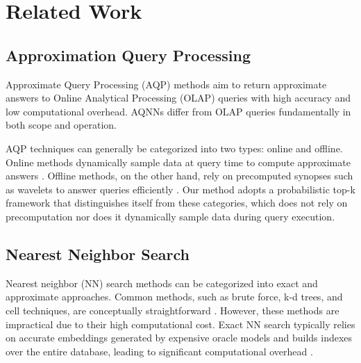 \section{Related Work}
\label{sec:relwork}
\subsection{Approximation Query Processing}

Approximate Query Processing (AQP) methods aim to return approximate answers to Online Analytical Processing (OLAP) queries with high accuracy and low computational overhead. AQNNs differ from OLAP queries fundamentally in both scope and operation. 

AQP techniques can generally be categorized into two types: online and offline. Online methods dynamically sample data at query time to compute approximate answers \cite{DBLP:conf/eurosys/AgarwalMPMMS13}. Offline methods, on the other hand, rely on precomputed synopses such as wavelets to answer queries efficiently \cite{DBLP:conf/vldb/ChakrabartiGRS00}. Our method adopts a probabilistic top-k framework that distinguishes itself from these categories, which does not rely on precomputation nor does it dynamically sample data during query execution. 

\subsection{Nearest Neighbor Search}
Nearest neighbor (NN) search methods can be categorized into exact and approximate approaches. Common methods, such as brute force, k-d trees, and cell techniques, are conceptually straightforward \cite{DBLP:journals/toms/FriedmanBF77, FRNNSurvey}. However, these methods are impractical due to their high computational cost. Exact NN search typically relies on accurate embeddings generated by expensive oracle models and builds indexes over the entire database, leading to significant computational overhead \cite{DBLP:conf/sigmod/LiZAH20}. 

